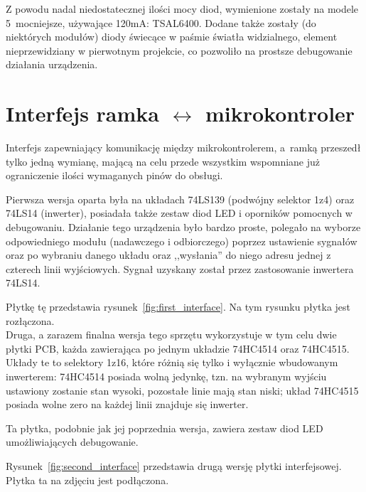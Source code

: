 Z powodu nadal niedostatecznej ilości mocy diod, wymienione zostały na modele 5\texttimes\  mocniejsze, używające 120mA: TSAL6400. Dodane także zostały (do niektórych modułów) diody świecące w paśmie światła widzialnego, element nieprzewidziany w pierwotnym projekcie, co pozwoliło na prostsze debugowanie działania urządzenia.\\

\section{Interfejs ramka $\leftrightarrow$ mikrokontroler}

Interfejs zapewniający komunikację między mikrokontrolerem, a~ram\-ką przeszedł tylko jedną wymianę, mającą na celu przede wszystkim wspomniane już ograniczenie ilości wymaganych pinów do obsługi.

Pierwsza wersja oparta była na układach 74LS139 (podwójny selektor 1\ppauza{}z\ppauza{}4) oraz 74LS14 (inwerter), posiadała także zestaw diod LED i oporników pomocnych w debugowaniu. Działanie tego urządzenia było bardzo proste, polegało na wyborze odpowiedniego modułu (nadawczego i odbiorczego) poprzez ustawienie sygnałów  oraz  po wybraniu danego układu oraz ,,wysłania'' do niego adresu jednej z czterech linii wyjściowych. Sygnał  uzyskany został przez zastosowanie inwertera 74LS14.

Płytkę tę przedstawia rysunek~\ref{fig:first_interface}.
Na tym rysunku płytka jest rozłączona.\\

Druga, a zarazem finalna wersja tego sprzętu wykorzystuje w tym celu dwie płytki PCB, każda zawierająca po jednym układzie 74HC4514 oraz 74HC4515. Układy te to selektory 1\ppauza{}z\ppauza{}16, które różnią się tylko i wyłącznie wbudowanym inwerterem: 74HC4514 posiada wolną jedynkę, tzn. na wybranym wyjściu ustawiony zostanie stan wysoki, pozostałe linie mają stan niski; układ 74HC4515 posiada wolne zero \pauza na każdej linii znajduje się inwerter.

Ta płytka, podobnie jak jej poprzednia wersja, zawiera zestaw diod LED umożliwiających debugowanie.

Rysunek~\ref{fig:second_interface} przedstawia drugą wersję płytki interfejsowej. Płytka ta na zdjęciu jest podłączona.\\

